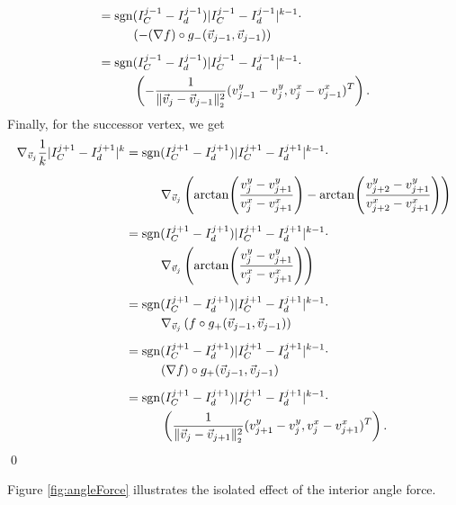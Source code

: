 \begin{proposition}
\begin{align*}
		&= \sgn(I^{j-1}_{C} - I^{j-1}_d)|I^{j-1}_{C} - I^{j-1}_d|^{k-1} \cdot \\
		&\hspace{1cm} (- (\nabla f) \circ g_{-}(\vec{v}_{j-1}, \vec{v}_{j-1})) \\[0.5em]
		&= \sgn(I^{j-1}_{C} - I^{j-1}_d)|I^{j-1}_{C} - I^{j-1}_d|^{k-1} \cdot \\
		&\hspace{1cm} \left(- \frac{1}{\norm[\vec{v}_j - \vec{v}_{j-1}]^2} (v_{j-1}^y - v_{j}^y, v_{j}^x - v_{j-1}^x )^T\right).		
	\end{align*}
	Finally, for the successor vertex, we get 
	\begin{align*}
		\nabla_{\vec{v}_j} \frac{1}{k}| I^{j+1}_{C} - I^{j+1}_d |^k 
		&= \sgn(I^{j+1}_{C} - I^{j+1}_d)|I^{j+1}_{C} - I^{j+1}_d|^{k-1} \cdot \\[0.5em]
		&\hspace{1cm} \nabla_{\vec{v}_j} \left(\arctan\!\left(\frac{v_{j}^{y} - v_{j+1}^{y}}{v_{j}^{x} - v_{j+1}^{x}}\right) - \arctan\!\left(\frac{v_{j+2}^{y} - v_{j+1}^{y}}{v_{j+2}^{x} - v_{j+1}^{x}}\right)\right) \\[0.5em]
		&= \sgn(I^{j+1}_{C} - I^{j+1}_d)|I^{j+1}_{C} - I^{j+1}_d|^{k-1} \cdot \\
		&\hspace{1cm} \nabla_{\vec{v}_j} \left(\arctan\!\left(\frac{v_{j}^{y} - v_{j+1}^{y}}{v_{j}^{x} - v_{j+1}^{x}}\right)\right) \\[0.5em]
		&= \sgn(I^{j+1}_{C} - I^{j+1}_d)|I^{j+1}_{C} - I^{j+1}_d|^{k-1} \cdot \\
		&\hspace{1cm} \nabla_{\vec{v}_j} \left( f \circ g_{+}(\vec{v}_{j-1}, \vec{v}_{j-1}) \right) \\[0.5em]
		&= \sgn(I^{j+1}_{C} - I^{j+1}_d)|I^{j+1}_{C} - I^{j+1}_d|^{k-1} \cdot \\
		&\hspace{1cm} (\nabla f) \circ g_{+}(\vec{v}_{j-1}, \vec{v}_{j-1}) \\[0.5em]
		&= \sgn(I^{j+1}_{C} - I^{j+1}_d)|I^{j+1}_{C} - I^{j+1}_d|^{k-1} \cdot \\
		&\hspace{1cm} \left(\frac{1}{\norm[\vec{v}_{j} - \vec{v}_{j+1}]^2} (v_{j+1}^y - v_{j}^y, v_{j}^x - v_{j+1}^x)^T \right).	
	\end{align*}
	\qed
\end{proposition}

Figure \ref{fig:angleForce} illustrates the isolated effect of the interior angle force.

